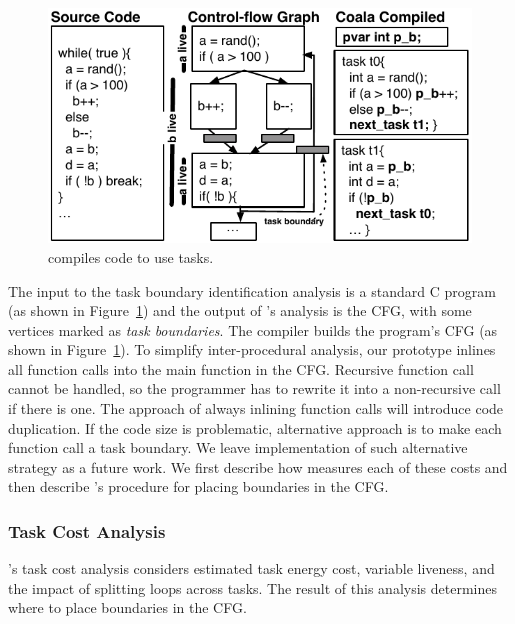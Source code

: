 
\begin{figure}
	\centering
	\includegraphics[width=.85\columnwidth]{figures/compiler.pdf}
	\caption{\sys compiles code to use tasks.}
	\label{fig:compiler_overview}
\end{figure}

The input to the task boundary identification analysis is a standard C program (as shown in Figure~\ref{fig:compiler_overview}) and the output of \sys's analysis is the CFG, with some vertices marked as {\em task boundaries}. The \sys compiler builds the program's CFG (as shown in
Figure~\ref{fig:compiler_overview}). To simplify inter-procedural analysis, our prototype inlines all function calls into the main function in the CFG. Recursive function call cannot be handled, so the programmer has to rewrite it into a non-recursive call if there is one. The approach of always inlining function calls will introduce code duplication. If the code size is problematic, alternative approach is to make each function call a task boundary. We leave implementation of such alternative strategy as a future work.
%
%
We first describe how \sys measures each of these costs and then describe \sys's procedure for placing boundaries in the CFG.

\subsubsection{Task Cost Analysis}

\sys's task cost analysis considers estimated task energy cost, variable liveness, and the impact of splitting loops across tasks. The result of this analysis determines where to place boundaries in the CFG.
 
